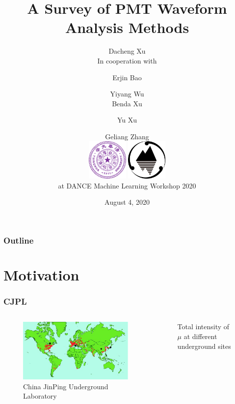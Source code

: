 \documentclass{beamer}
\title[Waveform Analysis]{A Survey of PMT Waveform Analysis Methods}
\author[Dacheng Xu]{Dacheng Xu \\ [4mm] In cooperation with \and Erjin Bao \and Yiyang Wu  \\ Benda Xu \and Yu Xu \and Geliang Zhang \\ [4mm] \includegraphics[height=2cm]{img/Tsinghua_University_Logo.png} \hspace{6mm} \includegraphics[height=2cm]{img/Js.png} \\ [4mm] at DANCE Machine Learning Workshop 2020 \\ [-8mm]}
\date[DANCE]{August 4, 2020}
\begin{document}
\frame{\titlepage}

\begin{frame}[noframenumbering]
\frametitle{Outline}
\thispagestyle{empty}
\tableofcontents
\end{frame}

\section{Motivation}
\begin{frame}
\setlength{\abovecaptionskip}{0mm}
\setlength{\belowcaptionskip}{0mm}
\setcounter{page}{0}
\frametitle{CJPL}
\begin{columns}
\begin{figure}
    \centering
    \caption{China JinPing Underground Laboratory\protect\footnotemark[1]}
    \includegraphics[width=1.0\linewidth]{img/WorldMap.jpg}
\end{figure}
\begin{figure}
    \centering
    \caption{Total intensity of $\mu$ at different underground sites\protect\footnotemark[2]}

\end{figure}
\end{columns}
\end{frame}
\end{document}
